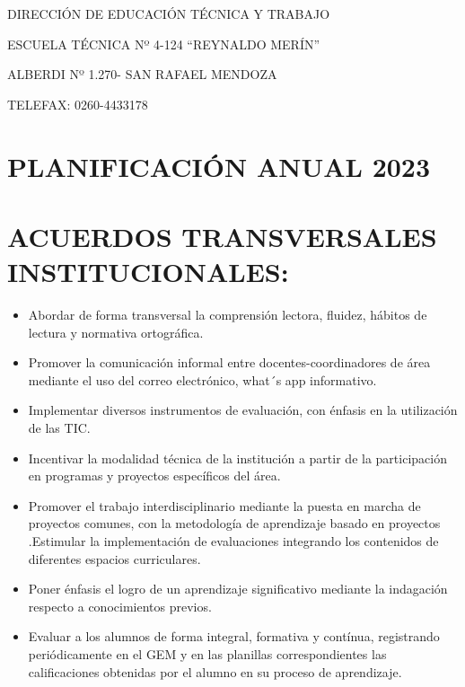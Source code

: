 \documentclass[../main]{subfiles}
\begin{document}

\newpage
\begin{center}
DIRECCIÓN DE EDUCACIÓN TÉCNICA Y TRABAJO

ESCUELA TÉCNICA Nº 4-124 “REYNALDO MERÍN”

ALBERDI Nº 1.270- SAN RAFAEL MENDOZA

TELEFAX: 0260-4433178

\section{PLANIFICACIÓN ANUAL 2023}

\end{center}

\section{ACUERDOS TRANSVERSALES INSTITUCIONALES:}
\begin{itemize}
\item Abordar de forma transversal la comprensión lectora, fluidez, hábitos de lectura y normativa ortográfica.
\item Promover la comunicación informal entre docentes-coordinadores de área mediante el uso del correo electrónico, what´s app informativo.
\item Implementar diversos instrumentos de evaluación, con énfasis en la utilización de las TIC.
\item Incentivar la modalidad técnica de la institución a partir de la participación en programas y proyectos específicos del área.
\item Promover el trabajo interdisciplinario mediante la puesta en marcha de proyectos comunes, con la metodología de aprendizaje basado en proyectos .Estimular la implementación de
evaluaciones integrando los contenidos de diferentes espacios curriculares.
\item Poner énfasis el logro de un aprendizaje significativo mediante la indagación respecto a conocimientos previos.
\item Evaluar a los alumnos de forma integral, formativa y contínua, registrando periódicamente en el GEM y en las planillas correspondientes las calificaciones obtenidas por el alumno en su
proceso de aprendizaje.
\end{itemize}
\end{document}

